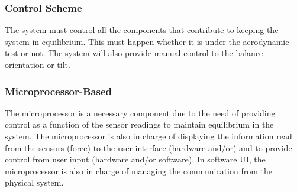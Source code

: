 		\subsubsection{Control Scheme}
			The system must control all the components that contribute to keeping the system in
			equilibrium. This must happen whether it is under the aerodynamic test or not. The
			system will also provide manual control to the balance orientation or tilt.

		\subsubsection{Microprocessor-Based}
			The microprocessor is a necessary component due to the need of providing control as a function of the sensor readings to maintain equilibrium in the system. The microprocessor is also in charge of displaying the information read from the sensors (force) to the user interface (hardware and/or) and to provide control from user input (hardware and/or software). In software UI, the microprocessor is also in charge of managing the communication from the physical system.